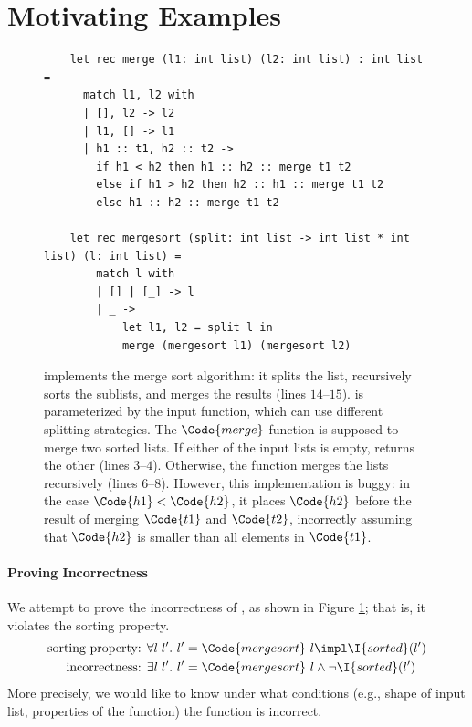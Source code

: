 \section{Motivating Examples}

\begin{figure}[!t]
    \begin{verbatim}
    let rec merge (l1: int list) (l2: int list) : int list =
      match l1, l2 with
      | [], l2 -> l2
      | l1, [] -> l1
      | h1 :: t1, h2 :: t2 ->
        if h1 < h2 then h1 :: h2 :: merge t1 t2
        else if h1 > h2 then h2 :: h1 :: merge t1 t2
        else h1 :: h2 :: merge t1 t2
    
    let rec mergesort (split: int list -> int list * int list) (l: int list) =
        match l with
        | [] | [_] -> l
        | _ ->
            let l1, l2 = split l in
            merge (mergesort l1) (mergesort l2)
    \end{verbatim}
    \caption{ implements the merge sort algorithm: it splits the list, recursively sorts the sublists, and merges the results (lines $14$--$15$).  is parameterized by the input  function, which can use different splitting strategies.
    The $\Code{merge}$ function is supposed to merge two sorted lists. If either of the input lists is empty,  returns the other (lines $3$--$4$). Otherwise, the function merges the lists recursively (lines $6$--$8$). However, this implementation is buggy: in the case $\Code{h1} < \Code{h2}$, it places $\Code{h2}$ before the result of merging $\Code{t1}$ and $\Code{t2}$, incorrectly assuming that $\Code{h2}$ is smaller than all elements in $\Code{t1}$. }
    \label{fig:motivation}
\end{figure}

\paragraph{Proving Incorrectness} We attempt to prove the incorrectness of , as shown in Figure \ref{fig:motivation}; that is, it violates the sorting property.
\begin{align*}
    \text{sorting property: } & \forall l\;l'.\ l' = \Code{mergesort}\ l \impl \I{sorted}(l')
    \\ \text{incorrectness: } & \exists l\;l'.\ l' = \Code{mergesort}\ l \land \neg \I{sorted}(l')
\end{align*}\noindent
More precisely, we would like to know under what conditions (e.g., shape of input list, properties of the  function) the  function is incorrect.

